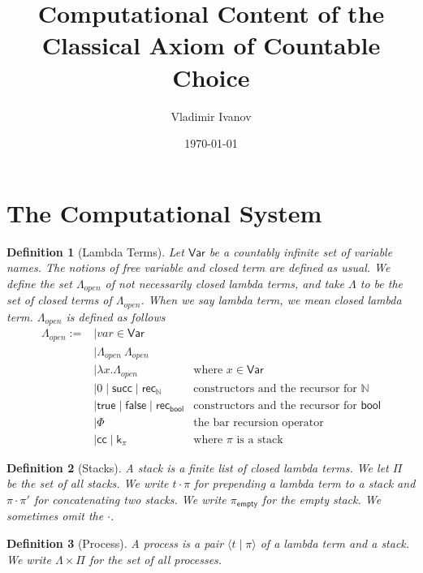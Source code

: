 \documentclass{article}
\title{Computational Content of the Classical Axiom of Countable Choice}
\author{Vladimir Ivanov}
\date{\today}
\newcommand{\successor}{\mathsf{succ}}
\newcommand{\N}{\mathbb{N}}
\newcommand{\recN}{\mathsf{rec}_{\mathbb{N}}}
\newcommand{\bool}{\mathsf{bool}}
\newcommand{\true}{\mathsf{true}}
\newcommand{\false}{\mathsf{false}}
\newcommand{\recbool}{\mathsf{rec_{bool}}}
\newcommand{\proc}[2]{\langle{#1}\mid{#2}\rangle}
\newcommand{\emptystack}{\pi_\mathsf{empty}}
\newcommand{\cc}{\mathsf{cc}}
\newcommand{\cont}{\mathsf{k}}
\newtheorem{definition}{Definition}
\begin{document}
    
\maketitle

\section{The Computational System}

\begin{definition}[Lambda Terms]
    Let $\mathsf{Var}$ be a countably infinite set of variable names.
    The notions of free variable and closed term are defined as usual.
    We define the set $\Lambda_{open}$ of not necessarily closed lambda terms, and take $\Lambda$ to be the set of closed terms of $\Lambda_{open}$. When we say lambda term, we mean closed lambda term. $\Lambda_{open}$ is defined as follows
    \begin{align*}
        \Lambda_{open} := & \mid var \in \mathsf{Var} \\
        & \mid \Lambda_{open}\ \Lambda_{open} \\
        & \mid \lambda x. \Lambda_{open} & \text{where $x \in \mathsf{Var}$} \\
        & \mid 0 \mid \successor \mid \recN & \text{constructors and the recursor for $\N$}\\
        & \mid \true \mid \false \mid \recbool & \text{constructors and the recursor for $\bool$}\\
        & \mid \Phi & \text{the bar recursion operator} \\
        & \mid \cc \mid \cont_\pi & \text{where $\pi$ is a stack}
    \end{align*}
\end{definition}

\begin{definition}[Stacks]
    A stack is a finite list of closed lambda terms.
    We let $\Pi$ be the set of all stacks.
    We write $t \cdot \pi$ for prepending a lambda term to a stack and $\pi \cdot \pi'$ for concatenating two stacks. We write $\emptystack$ for the empty stack.
    We sometimes omit the $\cdot$.
\end{definition}

\begin{definition}[Process]
    A process is a pair $\proc{t}{\pi}$ of a lambda term and a stack.
    We write $\Lambda \times \Pi$ for the set of all processes.
\end{definition}
\end{document}

